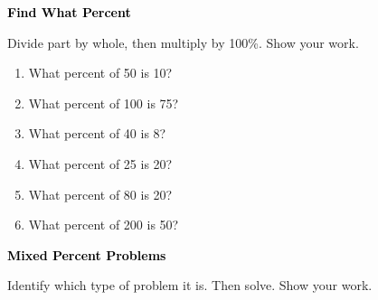 \documentclass[12pt, letterpaper, fleqn]{article}
\begin{document}
\newpage

\begin{tcolorbox}[colback=customteal!20]
\large\textcolor{black}{\textbf{Find What Percent}}
\end{tcolorbox}

\noindent
Divide part by whole, then multiply by 100\%. Show your work.

\vspace{3mm}

\begin{enumerate}[itemsep=1.5cm, leftmargin=0.6cm]

\item What percent of 50 is 10?

\vspace{1.3cm}

\item What percent of 100 is 75?

\vspace{1.3cm}

\item What percent of 40 is 8?

\vspace{1.3cm}

\item What percent of 25 is 20?

\vspace{1.3cm}

\item What percent of 80 is 20?

\vspace{1.3cm}

\item What percent of 200 is 50?

\vspace{1.3cm}

\end{enumerate}

\newpage

\begin{tcolorbox}[colback=customteal!20]
\large\textcolor{black}{\textbf{Mixed Percent Problems}}
\end{tcolorbox}

\noindent
Identify which type of problem it is. Then solve. Show your work.
\end{document}
